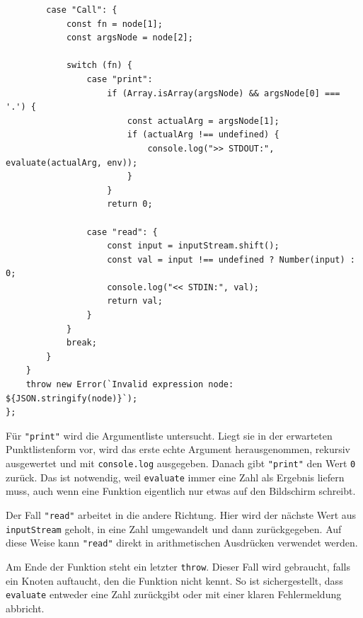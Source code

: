 \begin{listing}[htbp]
\caption{Arithmetische Auswertung in TypeScript (Teil 2: Funktionsaufrufe)}
\label{lst:ts-evaluate-2}
\begin{verbatim}
        case "Call": {
            const fn = node[1];
            const argsNode = node[2];
            
            switch (fn) {
                case "print":
                    if (Array.isArray(argsNode) && argsNode[0] === '.') {
                        const actualArg = argsNode[1];
                        if (actualArg !== undefined) {
                            console.log(">> STDOUT:", evaluate(actualArg, env));
                        }
                    }
                    return 0;
                    
                case "read": {
                    const input = inputStream.shift();
                    const val = input !== undefined ? Number(input) : 0;
                    console.log("<< STDIN:", val);
                    return val;
                }
            }
            break;
        }
    }
    throw new Error(`Invalid expression node: ${JSON.stringify(node)}`);
};
\end{verbatim}
\end{listing}

Für \texttt{"print"} wird die Argumentliste untersucht. Liegt sie in der erwarteten Punktlistenform vor, wird das erste echte Argument herausgenommen, rekursiv ausgewertet und mit \texttt{console.log} ausgegeben. Danach gibt \texttt{"print"} den Wert \texttt{0} zurück. Das ist notwendig, weil \texttt{evaluate} immer eine Zahl als Ergebnis liefern muss, auch wenn eine Funktion eigentlich nur etwas auf den Bildschirm schreibt.

Der Fall \texttt{"read"} arbeitet in die andere Richtung. Hier wird der nächste Wert aus \texttt{inputStream} geholt, in eine Zahl umgewandelt und dann zurückgegeben. Auf diese Weise kann \texttt{"read"} direkt in arithmetischen Ausdrücken verwendet werden.

Am Ende der Funktion steht ein letzter \texttt{throw}. Dieser Fall wird gebraucht, falls ein Knoten auftaucht, den die Funktion nicht kennt. So ist sichergestellt, dass \texttt{evaluate} entweder eine Zahl zurückgibt oder mit einer klaren Fehlermeldung abbricht.

